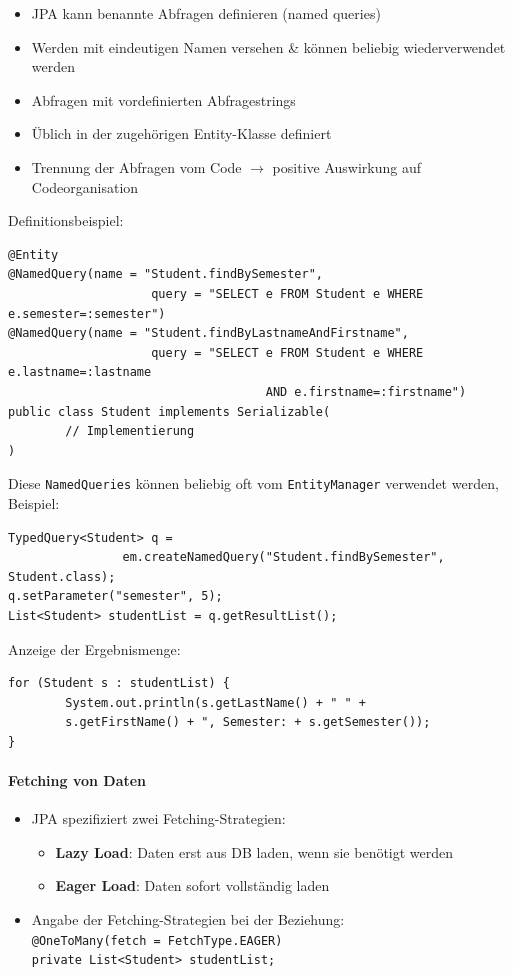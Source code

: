 \documentclass[a4paper]{article}
\begin{document}
					\begin{itemize}
						\item JPA kann benannte Abfragen definieren (named queries)
						\item Werden mit eindeutigen Namen versehen \& können beliebig wiederverwendet werden
						\item Abfragen mit vordefinierten Abfragestrings
						\item Üblich in der zugehörigen Entity-Klasse definiert
						\item Trennung der Abfragen vom Code $\rightarrow$ positive Auswirkung auf Codeorganisation\\
					\end{itemize}
					Definitionsbeispiel:
					\begin{lstlisting}
@Entity
@NamedQuery(name = "Student.findBySemester",
					query = "SELECT e FROM Student e WHERE e.semester=:semester")
@NamedQuery(name = "Student.findByLastnameAndFirstname",
					query = "SELECT e FROM Student e WHERE e.lastname=:lastname
									AND e.firstname=:firstname")
public class Student implements Serializable(
		// Implementierung
)
					\end{lstlisting}
					Diese \texttt{NamedQueries} können beliebig oft vom \texttt{EntityManager} verwendet werden, Beispiel:
					\begin{lstlisting}
TypedQuery<Student> q = 
				em.createNamedQuery("Student.findBySemester", Student.class);
q.setParameter("semester", 5);
List<Student> studentList = q.getResultList();
					\end{lstlisting}
					Anzeige der Ergebnismenge:
					\begin{lstlisting}
for (Student s : studentList) {
		System.out.println(s.getLastName() + " " + 
		s.getFirstName() + ", Semester: + s.getSemester());
}
					\end{lstlisting}
					
				\paragraph{Fetching von Daten}
				
					\begin{itemize}
						\item JPA spezifiziert zwei Fetching-Strategien:
							\begin{itemize}
								\item \textbf{Lazy Load}: Daten erst aus DB laden, wenn sie benötigt werden
								\item \textbf{Eager Load}: Daten sofort vollständig laden
							\end{itemize}
						\item Angabe der Fetching-Strategien bei der Beziehung:\\
						\texttt{@OneToMany(fetch = FetchType.EAGER)\\
									private List<Student> studentList;}				
					\end{itemize}
			
\end{document}
